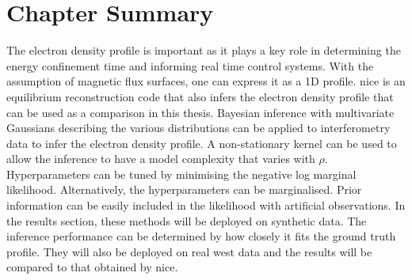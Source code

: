 \section{Chapter Summary}

The electron density profile is important as it plays a key role in determining the energy confinement time and informing real time control systems. With the assumption of magnetic flux surfaces, one can express it as a 1D profile. \gls{nice} is an equilibrium reconstruction code that also infers the electron density profile that can be used as a comparison in this thesis. Bayesian inference with multivariate Gaussians describing the various distributions can be applied to interferometry data to infer the electron density profile. A non-stationary kernel can be used to allow the inference to have a model complexity that varies with $\rho$. Hyperparameters can be tuned by minimising the negative log marginal likelihood. Alternatively, the hyperparameters can be marginalised. Prior information can be easily included in the likelihood with artificial observations. In the results section, these methods will be deployed on synthetic data. The inference performance can be determined by how closely it fits the ground truth profile. They will also be deployed on real \gls{west} data and the results will be compared to that obtained by \gls{nice}.




